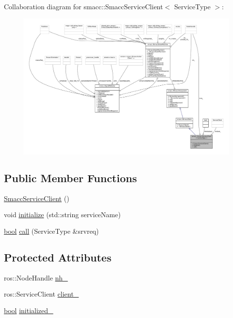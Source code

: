Collaboration diagram for smacc\+:\+:Smacc\+Service\+Client$<$ Service\+Type $>$\+:
\nopagebreak
\begin{figure}[H]
\begin{center}
\leavevmode
\includegraphics[width=350pt]{classsmacc_1_1SmaccServiceClient__coll__graph}
\end{center}
\end{figure}
\subsection*{Public Member Functions}
\begin{DoxyCompactItemize}
\item 
\hyperlink{classsmacc_1_1SmaccServiceClient_a54f6b9cd746c3e6c604afa1c93b990fd}{Smacc\+Service\+Client} ()
\item 
void \hyperlink{classsmacc_1_1SmaccServiceClient_a5be21b63eb7cfe54d9ac7de33c3c0938}{initialize} (std\+::string service\+Name)
\item 
\hyperlink{classbool}{bool} \hyperlink{classsmacc_1_1SmaccServiceClient_a1b749ce13f3cb1dbf10a5992c05c173e}{call} (Service\+Type \&srvreq)
\end{DoxyCompactItemize}
\subsection*{Protected Attributes}
\begin{DoxyCompactItemize}
\item 
ros\+::\+Node\+Handle \hyperlink{classsmacc_1_1SmaccServiceClient_a6e5e8b77b4c7137f9c820b09c8f661b5}{nh\+\_\+}
\item 
ros\+::\+Service\+Client \hyperlink{classsmacc_1_1SmaccServiceClient_a6eed795ca67ec50096a9e5695d4281c6}{client\+\_\+}
\item 
\hyperlink{classbool}{bool} \hyperlink{classsmacc_1_1SmaccServiceClient_a251b147a783f05d13edb272b85f64982}{initialized\+\_\+}
\end{DoxyCompactItemize}



